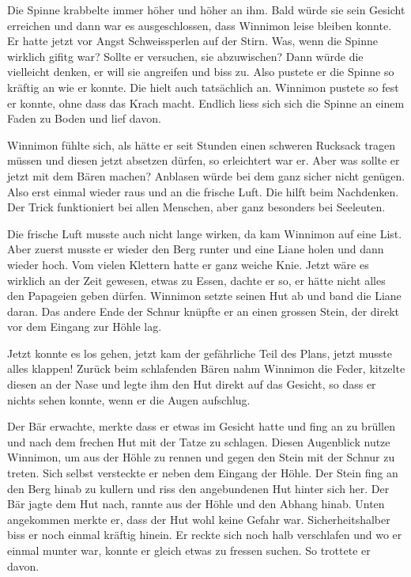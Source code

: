 Die Spinne krabbelte immer höher und höher an ihm. Bald würde sie sein Gesicht erreichen und dann war es ausgeschlossen, dass Winnimon leise bleiben konnte. Er hatte jetzt vor Angst Schweissperlen auf der Stirn. Was, wenn die Spinne wirklich gifitg war? Sollte er versuchen, sie abzuwischen? Dann würde die vielleicht denken, er will sie angreifen und biss zu. Also pustete er die Spinne so kräftig an wie er konnte. Die hielt auch tatsächlich an. Winnimon pustete so fest er konnte, ohne dass das Krach macht. Endlich liess sich sich die Spinne an einem Faden zu Boden und lief davon.

Winnimon fühlte sich, als hätte er seit Stunden einen schweren Rucksack tragen müssen und diesen jetzt absetzen dürfen, so erleichtert war er. Aber was sollte er jetzt mit dem Bären machen? Anblasen würde bei dem ganz sicher nicht genügen. Also erst einmal wieder raus und an die frische Luft. Die hilft beim Nachdenken. Der Trick funktioniert bei allen Menschen, aber ganz besonders bei Seeleuten.

Die frische Luft musste auch nicht lange wirken, da kam Winnimon auf eine List. Aber zuerst musste er wieder den Berg runter und eine Liane holen und dann wieder hoch. Vom vielen Klettern hatte er ganz weiche Knie. Jetzt wäre es wirklich an der Zeit gewesen, etwas zu Essen, dachte er so, er hätte nicht alles den Papageien geben dürfen. Winnimon setzte seinen Hut ab und band die Liane daran. Das andere Ende der Schnur knüpfte er an einen grossen Stein, der direkt vor dem Eingang zur Höhle lag.

Jetzt konnte es los gehen, jetzt kam der gefährliche Teil des Plans, jetzt musste alles klappen! Zurück beim schlafenden Bären nahm Winnimon die Feder, kitzelte diesen an der Nase und legte ihm den Hut direkt auf das Gesicht, so dass er nichts sehen konnte, wenn er die Augen aufschlug.

Der Bär erwachte, merkte dass er etwas im Gesicht hatte und fing an zu brüllen und nach dem frechen Hut mit der Tatze zu schlagen. Diesen Augenblick nutze Winnimon, um aus der Höhle zu rennen und gegen den Stein mit der Schnur zu treten. Sich selbst versteckte er neben dem Eingang der Höhle. Der Stein fing an den Berg hinab zu kullern und riss den angebundenen Hut hinter sich her. Der Bär jagte dem Hut nach, rannte aus der Höhle und den Abhang hinab. Unten angekommen merkte er, dass der Hut wohl keine Gefahr war. Sicherheitshalber biss er noch einmal kräftig hinein. Er reckte sich noch halb verschlafen und wo er einmal munter war, konnte er gleich etwas zu fressen suchen. So trottete er davon.

